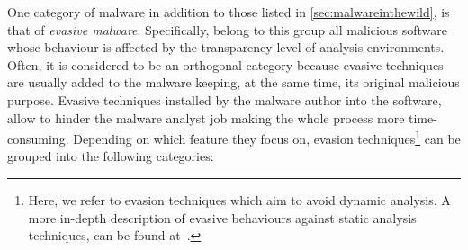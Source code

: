 \documentclass[LaM,binding=0.6cm]{sapthesis}
\begin{document}
One category of malware in addition to those listed in \autoref{sec:malwareinthewild}, is that of \textit{evasive malware}. Specifically, belong to this group all malicious software whose behaviour is affected by the transparency level of analysis environments. Often, it is considered to be an orthogonal category because evasive techniques are usually added to the malware keeping, at the same time, its original malicious purpose. Evasive techniques installed by the malware author into the software, allow to hinder the malware analyst job making the whole process more time-consuming.
\newpage
Depending on which feature they focus on, evasion techniques\footnote{Here, we refer to evasion techniques which aim to avoid dynamic analysis. A more in-depth description of evasive behaviours against static analysis techniques, can be found at~\cite{moser2007limits}.} can be grouped into the following categories:
\end{document}
